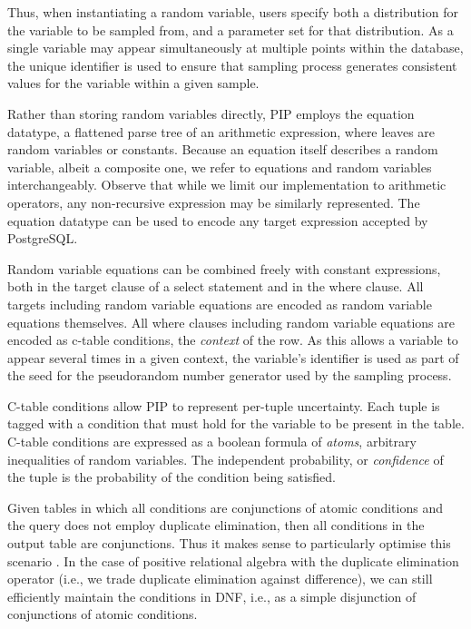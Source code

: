 Thus, when instantiating a random variable, users specify both a distribution for the variable to be sampled from, and a parameter set for that distribution.  As a single variable may appear simultaneously at multiple points within the database, the unique identifier is used to ensure that sampling process generates consistent values for the variable within a given sample.  

Rather than storing random variables directly, PIP employs the equation datatype, a flattened parse tree of an arithmetic expression, where leaves are random variables or constants.  Because an equation itself describes a random variable, albeit a composite one, we refer to equations and random variables interchangeably.  Observe that while we limit our implementation to arithmetic operators, any non-recursive expression may be similarly represented.  The equation datatype can be used to encode any target expression accepted by PostgreSQL.  

Random variable equations can be combined freely with constant expressions, both in the target clause of a select statement and in the where clause.  All targets including random variable equations are encoded as random variable equations themselves.  All where clauses including random variable equations are encoded as c-table conditions, the \textit{context} of the row.  As this allows a variable to appear several times in a given context, the variable's identifier is used as part of the seed for the pseudorandom number generator used by the sampling process.

C-table conditions allow PIP to represent per-tuple uncertainty.  Each tuple is tagged with a condition that must hold for the variable to be present in the table.  C-table conditions are expressed as a boolean formula of \textit{atoms}, arbitrary inequalities of random variables.  The independent probability, or \textit{confidence} of the tuple is the probability of the condition being satisfied.  

Given  tables  in which  all  conditions  are  conjunctions of  atomic conditions and  the query does not employ  duplicate elimination, then all conditions  in the output  table are conjunctions.  Thus  it makes sense to particularly optimise this scenario \cite{AJKO2008}. In the case of positive relational algebra  with the duplicate elimination  operator (i.e., we trade  duplicate   elimination  against  difference),   we  can  still efficiently  maintain  the  conditions  in  DNF,  i.e.,  as  a  simple disjunction of conjunctions of atomic conditions.

